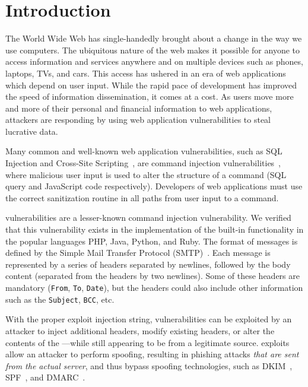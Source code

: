\section{Introduction}\label{sec:Introduction}

The World Wide Web has single-handedly brought about a change in the way we use computers. The ubiquitous nature of the web makes it possible for anyone to access information and services anywhere and on multiple devices such as phones, laptops, TVs, and cars. This access has ushered in an era of web applications which depend on user input.
While the rapid pace of development has improved the speed of
information dissemination, it comes at a cost. As users move more and
more of their personal and financial information to web applications,
attackers are responding by using web application vulnerabilities to steal lucrative data.

Many common and well-known web application vulnerabilities, such as SQL Injection and Cross-Site Scripting~\cite{OWASPT10}, are command injection vulnerabilities~\cite{commandinjection}, where malicious user input is used to alter the structure of a command (SQL query and JavaScript code respectively). Developers of web applications must use the correct sanitization routine in all paths from user input to a command. 

\ehi vulnerabilities are a lesser-known command injection vulnerability. We verified that this vulnerability exists in the implementation of the built-in \email functionality in the popular languages PHP, Java, Python, and Ruby. The format of \email messages is defined by the Simple Mail Transfer Protocol (SMTP)~\cite{rfc5322}. Each \email message is represented by a series of headers separated by newlines, followed by the body content (separated from the headers by two newlines). Some of these headers are mandatory (\lstinline{From}, \lstinline{To}, \lstinline{Date}), but the headers could also include other information such as the \lstinline{Subject}, \lstinline{BCC}, etc.

With the proper exploit injection string, \ehi vulnerabilities can be exploited by an attacker to inject additional headers, modify existing headers, or alter the contents of the \email---while still appearing to be from a legitimate source. \ehi exploits allow an attacker to perform \email spoofing, resulting in phishing attacks \emph{that are sent from the actual \email server}, and thus bypass \email spoofing technologies, such as DKIM~\cite{allman2007domainkeys}, SPF~\cite{schlitt2006sender}, and DMARC~\cite{kucherawy2015domain}.

